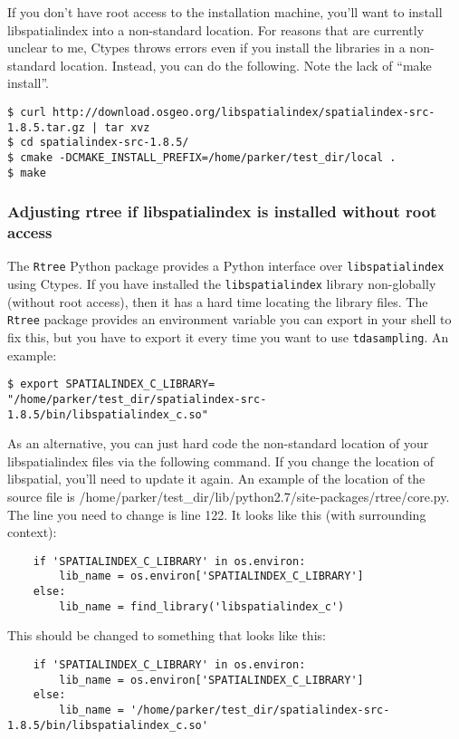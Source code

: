 \documentclass[11pt]{article}
\begin{document}
If you don't have root access to the installation machine, you'll want to install libspatialindex into a non-standard location. For reasons that are currently unclear to me, Ctypes throws errors even if you install the libraries in a non-standard location. Instead, you can do the following. Note the lack of ``make install''.

\begin{verbatim} 
$ curl http://download.osgeo.org/libspatialindex/spatialindex-src-1.8.5.tar.gz | tar xvz
$ cd spatialindex-src-1.8.5/
$ cmake -DCMAKE_INSTALL_PREFIX=/home/parker/test_dir/local .
$ make 
\end{verbatim} 


\subsubsection{Adjusting rtree if libspatialindex is installed without root access}
The \texttt{Rtree} Python package provides a Python interface over \texttt{libspatialindex} using Ctypes. If you have installed the \texttt{libspatialindex} library non-globally (without root access), then it has a hard time locating the library files. The \texttt{Rtree} package provides an environment variable you can export in your shell to fix this, but you have to export it every time you want to use \texttt{tdasampling}. An example: 

\begin{verbatim} 
$ export SPATIALINDEX_C_LIBRARY=
"/home/parker/test_dir/spatialindex-src-1.8.5/bin/libspatialindex_c.so"
\end{verbatim} 

As an alternative, you can just hard code the non-standard location of your libspatialindex files via the following command. If you change the location of libspatial, you'll need to update it again. An example of the location of the source file is /home/parker/test\_dir/lib/python2.7/site-packages/rtree/core.py. The line you need to change is line 122. It looks like this (with surrounding context):

\begin{verbatim} 
    if 'SPATIALINDEX_C_LIBRARY' in os.environ:
        lib_name = os.environ['SPATIALINDEX_C_LIBRARY']
    else:
        lib_name = find_library('libspatialindex_c')
\end{verbatim} 

This should be changed to something that looks like this: 

\begin{verbatim} 
    if 'SPATIALINDEX_C_LIBRARY' in os.environ:
        lib_name = os.environ['SPATIALINDEX_C_LIBRARY']
    else:
        lib_name = '/home/parker/test_dir/spatialindex-src-1.8.5/bin/libspatialindex_c.so'
\end{verbatim} 
\end{document}
